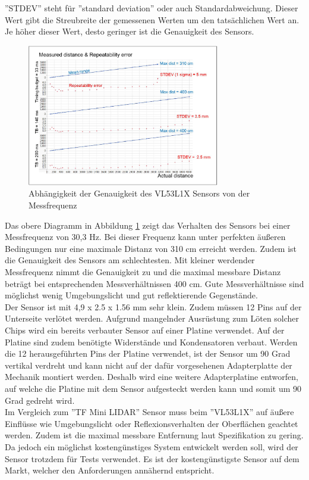 ''STDEV'' steht für ''standard deviation'' oder auch Standardabweichung. Dieser Wert gibt die Streubreite der gemessenen Werten um den tatsächlichen Wert an. Je höher dieser Wert, desto geringer ist die Genauigkeit des Sensors. \\ 
\begin{figure}[H]
	\centering
	\includegraphics[width=0.75\textwidth]{images/Hardware/VL53L1X_Messfrequenz}
	\caption{Abhängigkeit der Genauigkeit des VL53L1X Sensors von der Messfrequenz}
	\label{VL53L1X}
\end{figure}
Das obere Diagramm in Abbildung \ref{VL53L1X} zeigt das Verhalten des Sensors bei einer Messfrequenz von 30,3 Hz. Bei dieser Frequenz kann unter perfekten äußeren Bedingungen nur eine maximale Distanz von 310 cm erreicht werden. Zudem ist die Genauigkeit des Sensors am schlechtesten. Mit kleiner werdender Messfrequenz nimmt die Genauigkeit zu und die maximal messbare Distanz beträgt bei entsprechenden Messverhältnissen 400 cm. Gute Messverhältnisse sind möglichst wenig Umgebungslicht und gut reflektierende Gegenstände. \cite{VL53L1X_manual}\\
Der Sensor ist mit 4,9 x 2.5 x 1.56 mm sehr klein. Zudem müssen 12 Pins auf der Unterseite verlötet werden. Aufgrund mangelnder Ausrüstung zum Löten solcher Chips wird ein bereits verbauter Sensor auf einer Platine verwendet. Auf der Platine sind zudem benötigte Widerstände und Kondensatoren verbaut. Werden die 12 herausgeführten Pins der Platine verwendet, ist der Sensor um 90 Grad vertikal verdreht und kann nicht auf der dafür vorgesehenen Adapterplatte der Mechanik montiert werden. Deshalb wird eine weitere Adapterplatine entworfen, auf welche die Platine mit dem Sensor aufgesteckt werden kann und somit um 90 Grad gedreht wird.\\
Im Vergleich zum ''TF Mini LIDAR'' Sensor muss beim ''VL53L1X'' auf äußere Einflüsse wie Umgebungslicht oder Reflexionsverhalten der Oberflächen geachtet werden. Zudem ist die maximal messbare Entfernung laut Spezifikation zu gering. Da jedoch ein möglichst kostengünstiges System entwickelt werden soll, wird der Sensor trotzdem für Tests verwendet. Es ist der kostengünstigste Sensor auf dem Markt, welcher den Anforderungen annähernd entspricht.
\newpage

